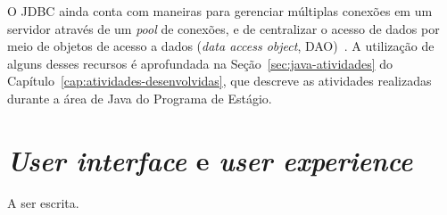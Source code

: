 O JDBC ainda conta com maneiras para gerenciar múltiplas conexões em um servidor através de um \textit{pool} de conexões, e de centralizar o acesso de dados por meio de objetos de acesso a dados (\textit{data access object}, DAO)~\cite{databaseprogramming-2000}. A utilização de alguns desses recursos é aprofundada na Seção~\ref{sec:java-atividades} do Capítulo~\ref{cap:atividades-desenvolvidas}, que descreve as atividades realizadas durante a área de Java do Programa de Estágio.

\section{\textit{User interface} e \textit{user experience}}
\label{sec:ui-e-ux}

A ser escrita.
